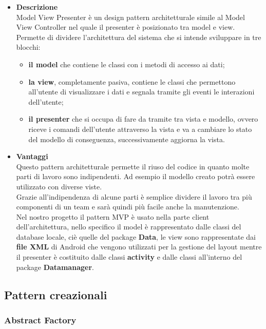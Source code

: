 		\begin{itemize}	
			\item \textbf{Descrizione} \\ Model View Presenter è un design pattern architetturale simile al Model View Controller nel quale il presenter è posizionato tra model e view. Permette di dividere l'architettura del sistema che si intende sviluppare in tre blocchi:
			\begin{itemize}
				\item \textbf{il model} che contiene le classi con i metodi di accesso ai dati;
				\item \textbf{la view}, completamente pasiva, contiene le classi che permettono all'utente di visualizzare i dati e segnala tramite gli eventi le interazioni dell'utente;
				\item \textbf{il presenter} che si occupa di fare da tramite tra vista e modello, ovvero riceve i comandi dell'utente attraverso la vista e va a cambiare lo stato del modello di conseguenza, successivamente aggiorna la vista.				
			\end{itemize}
			
			\item \textbf{Vantaggi} \\
			Questo pattern architetturale permette il riuso del codice in quanto molte parti di lavoro sono indipendenti. Ad esempio il modello creato potrà essere utilizzato con diverse viste. \\ Grazie all'indipendenza di alcune parti è semplice dividere il lavoro tra più componenti di un team e sarà quindi più facile anche la manutenzione.
			\utilizzo \\
			Nel nostro progetto il pattern MVP è usato nella parte client dell'architettura, nello specifico il model è rappresentato dalle classi del database locale, ciè quelle del package \textbf{Data}, le view sono rappresentate dai \textbf{file XML} di Android che vengono utilizzati per la gestione del layout mentre il presenter è costituito dalle classi \textbf{activity} e dalle classi all'interno del package \textbf{Datamanager}.
		\end{itemize}
		
		\newpage
		
\subsection{Pattern creazionali}
	\subsubsection{Abstract Factory}
	
